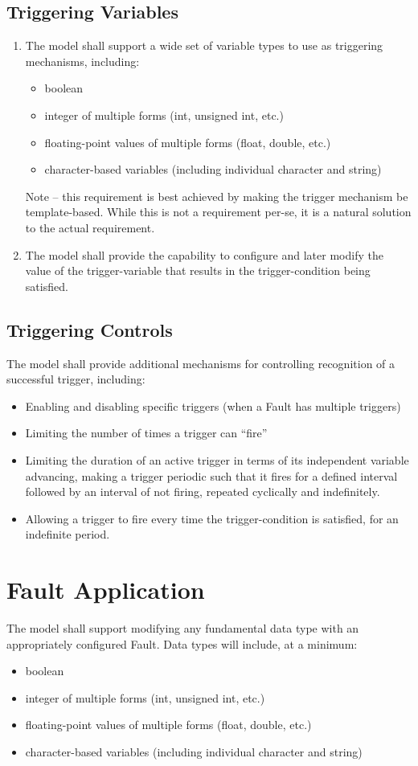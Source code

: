 \documentclass[11pt,fleqn]{report}
\begin{document}
\subsection{Triggering Variables}
\begin{enumerate}
 \item The model shall support a wide set of variable types to use as triggering
   mechanisms, including:
  \begin{itemize}
   \item boolean
   \item integer of multiple forms (int, unsigned int, etc.)
   \item floating-point values of multiple forms (float, double, etc.)
   \item character-based variables (including individual character and string)
  \end{itemize}
  Note -- this requirement is best achieved by making the trigger mechanism be
  template-based. While this is not a requirement per-se, it is a natural
  solution
  to the actual requirement.
 \item The model shall provide the capability to configure and later modify the
   value of the trigger-variable that results in the trigger-condition being
   satisfied.
\end{enumerate}

\subsection {Triggering Controls}
The model shall provide additional mechanisms for controlling recognition of a
successful trigger, including:
\begin{itemize}
 \item Enabling and disabling specific triggers (when a Fault has multiple
 triggers)
 \item Limiting the number of times a trigger can ``fire''
 \item Limiting the duration of an active trigger in terms of its independent
   variable advancing, making a trigger periodic such that it fires for a
   defined interval followed by an interval of not firing, repeated cyclically
   and indefinitely.
 \item Allowing a trigger to fire every time the trigger-condition is
   satisfied, for an indefinite period.
 \end{itemize}

\section {Fault Application}
The model shall support modifying any fundamental data type with an
appropriately configured Fault. Data types will include, at a minimum:
\begin{itemize}
 \item boolean
 \item integer of multiple forms (int, unsigned int, etc.)
 \item floating-point values of multiple forms (float, double, etc.)
 \item character-based variables (including individual character and string)
\end{itemize}
\end{document}

